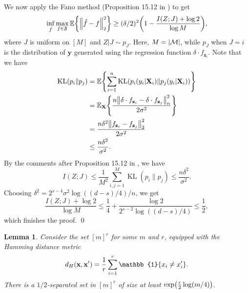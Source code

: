 \documentclass[11pt]{article}
\newtheorem{lemma}[theorem]{Lemma}
\newcommand{\bx}{\mathbf{x}}
\newcommand{\by}{\mathbf{y}}
\newcommand{\bz}{\mathbf{z}}
\newcommand{\bX}{\mathbf{X}}
\DeclarePairedDelimiter{\braces}{\lbrace}{\rbrace}
\DeclarePairedDelimiter{\paren}{(}{)}
\DeclarePairedDelimiter{\abs}{|}{|}
\DeclarePairedDelimiter{\norm}{\|}{\|}
\newcommand{\E}{\mathbb{E}}
\newcommand{\indicator}{\mathbb{1}}
\newcommand{\KL}{\operatorname{KL}}
\newcommand{\nfeats}{d}
\newcommand{\nsamples}{n}
\newcommand{\funcclass}{\mathfrak{F}}
\begin{document}
    We now apply the Fano method (Proposition 15.12 in \cite{wainwright2019high}) to get
    \begin{equation}
        \inf_{\hat f}\max_{f \in \funcclass} \E\braces*{\norm*{\hat f - f}_2^2} \geq (\delta/2)^2 \paren*{1 - \frac{I(Z;J) + \log 2}{\log M}},
    \end{equation}
    where $J$ is uniform on $[M]$ and $Z|J \sim p_J$.
    Here, $M = \abs*{\mathcal{M}}$, while $p_J$ when $J=i$ is the distribution of $\by$ generated using the regression function $\delta \cdot f_{\bz_i}$.
    Note that we have
    \begin{equation}
        \begin{split}
            \KL(p_i\|p_{j}) & = \E\braces*{\sum_{i=1}^\nsamples \KL\paren*{p_i(y_i|\bX_i) \|p_j(y_i|\bX_i)}} \\
            & = \E_\bX\braces*{\frac{n\norm*{\delta \cdot f_{\bz_i} - \delta \cdot f_{\bz_j}}_n^2}{2\sigma^2}} \\
            & = \frac{n\delta^2 \norm*{ f_{\bz_i} - f_{\bz_j}}_2^2}{2\sigma^2} \\
            & \leq \frac{n\delta^2}{\sigma^2}.
        \end{split}
    \end{equation}
    By the comments after Proposition 15.12 in \cite{wainwright2019high}, we have
    \begin{equation}
        I(Z;J) \leq \frac{1}{M^2}\sum_{i,j=1}^M \KL(p_i\|p_{j}) \leq \frac{n\delta^2}{\sigma^2}.
    \end{equation}
    Choosing $\delta^2 = 2^{s-4}\sigma^2\log((d-s)/4)/n$, we get
    \begin{equation}
        \frac{I(Z;J) + \log 2}{\log M} \leq \frac{1}{4} + \frac{\log 2}{2^{s-2}\log((d-s)/4)} \leq \frac{1}{2},
    \end{equation}
    which finishes the proof. \qed

\begin{lemma}
    \label{lem:packing_number_for_dary_cube}
    Consider the set $[m]^r$ for some $m$ and $r$, equipped with the Hamming distance metric
    $$
    d_H(\bx,\bx') = \frac{1}{r}\sum_{i=1}^r \indicator\braces*{x_i \neq x_i'}.
    $$
    There is a $1/2$-separated set in $[m]^r$ of size at least $\exp\paren*{\frac{r}{2}\log (m/4)}$.
\end{lemma}
\end{document}
